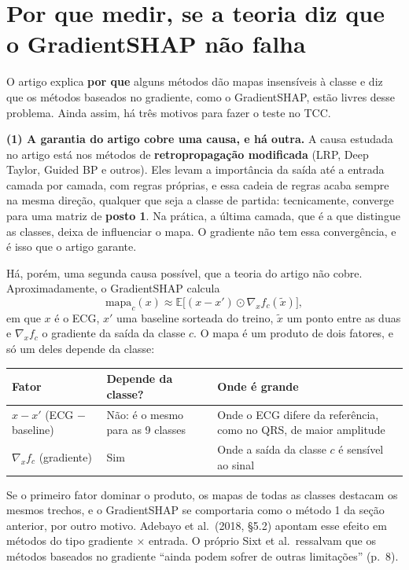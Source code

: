 \documentclass[11pt,a4paper]{article}
\begin{document}
\section{Por que medir, se a teoria diz que o GradientSHAP não falha}\label{sec:porque}
O artigo explica \textbf{por que} alguns métodos dão mapas insensíveis à classe e diz que os métodos baseados no gradiente, como o GradientSHAP, estão livres desse problema. Ainda assim, há três motivos para fazer o teste no TCC.

\textbf{(1) A garantia do artigo cobre uma causa, e há outra.} A causa estudada no artigo está nos métodos de \textbf{retropropagação modificada} (LRP, Deep Taylor, Guided BP e outros). Eles levam a importância da saída até a entrada camada por camada, com regras próprias, e essa cadeia de regras acaba sempre na mesma direção, qualquer que seja a classe de partida: tecnicamente, converge para uma matriz de \textbf{posto 1}. Na prática, a última camada, que é a que distingue as classes, deixa de influenciar o mapa. O gradiente não tem essa convergência, e é isso que o artigo garante.

Há, porém, uma segunda causa possível, que a teoria do artigo não cobre. Aproximadamente, o GradientSHAP calcula
\[
\text{mapa}_c(x) \approx \mathbb{E}\big[(x - x') \odot \nabla_x f_c(\tilde{x})\big],
\]
em que $x$ é o ECG, $x'$ uma baseline sorteada do treino, $\tilde{x}$ um ponto entre as duas e $\nabla_x f_c$ o gradiente da saída da classe $c$. O mapa é um produto de dois fatores, e só um deles depende da classe:
\begin{center}\small
\begin{tabularx}{\linewidth}{lXX}
\toprule
\textbf{Fator} & \textbf{Depende da classe?} & \textbf{Onde é grande} \\
\midrule
$x - x'$ (ECG $-$ baseline) & Não: é o mesmo para as 9 classes & Onde o ECG difere da referência, como no QRS, de maior amplitude \\
$\nabla_x f_c$ (gradiente) & Sim & Onde a saída da classe $c$ é sensível ao sinal \\
\bottomrule
\end{tabularx}
\end{center}
Se o primeiro fator dominar o produto, os mapas de todas as classes destacam os mesmos trechos, e o GradientSHAP se comportaria como o método 1 da seção anterior, por outro motivo. Adebayo et al.\ (2018, §5.2) apontam esse efeito em métodos do tipo gradiente × entrada. O próprio Sixt et al.\ ressalvam que os métodos baseados no gradiente “ainda podem sofrer de outras limitações” (p.~8).
\end{document}

